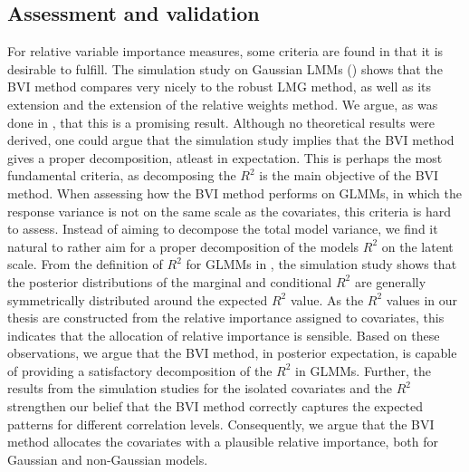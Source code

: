 \subsection*{Assessment and validation}
For relative variable importance measures, some criteria are found in  that it is desirable to fulfill. The simulation study on Gaussian LMMs () shows that the BVI method compares very nicely to the robust LMG method, as well as its extension and the extension of the relative weights method. We argue, as was done in \citet{Arnstad:Relative_variable_importance_in_Bayesian_linear_mixed_models:2024}, that this is a promising result. Although no theoretical results were derived, one could argue that the simulation study implies that the BVI method gives a proper decomposition, atleast in expectation. This is perhaps the most fundamental criteria, as decomposing the $R^2$ is the main objective of the BVI method.
When assessing how the BVI method performs on GLMMs, in which the response variance is not on the same scale as the covariates, this criteria is hard to assess. Instead of aiming to decompose the total model variance, we find it natural to rather aim for a proper decomposition of the models $R^2$ on the latent scale. From the definition of $R^2$ for GLMMs in \citet{nakagawa2013general}, the simulation study shows that the posterior distributions of the marginal and conditional $R^2$ are generally symmetrically distributed around the expected $R^2$ value. As the $R^2$ values in our thesis are constructed from the relative importance assigned to covariates, this indicates that the allocation of relative importance is sensible. Based on these observations, we argue that the BVI method, in posterior expectation, is capable of providing a satisfactory decomposition of the $R^2$ in GLMMs. Further, the results from the simulation studies for the isolated covariates and the $R^2$ strengthen our belief that the BVI method correctly captures the expected patterns for different correlation levels. Consequently, we argue that the BVI method allocates the covariates with a plausible relative importance, both for Gaussian and non-Gaussian models.
